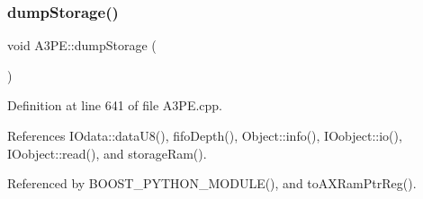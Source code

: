 \mbox{\label{classA3PE_ad7999557f9d561dec67526730a3c97ef}} 
\subsubsection{\texorpdfstring{dump\+Storage()}{dumpStorage()}}
{\footnotesize\ttfamily void A3\+P\+E\+::dump\+Storage (\begin{DoxyParamCaption}{ }\end{DoxyParamCaption})}



Definition at line 641 of file A3\+P\+E.\+cpp.



References I\+Odata\+::data\+U8(), fifo\+Depth(), Object\+::info(), I\+Oobject\+::io(), I\+Oobject\+::read(), and storage\+Ram().



Referenced by B\+O\+O\+S\+T\+\_\+\+P\+Y\+T\+H\+O\+N\+\_\+\+M\+O\+D\+U\+L\+E(), and to\+A\+X\+Ram\+Ptr\+Reg().


